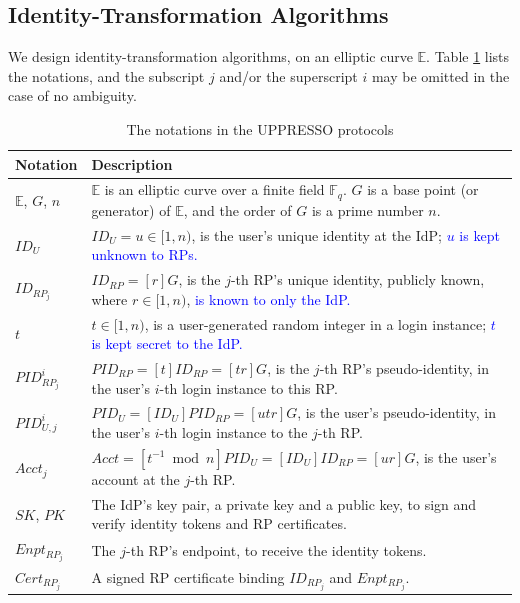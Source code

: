 
\subsection{Identity-Transformation Algorithms}
\label{subsec:overview}

We design identity-transformation algorithms,
    on an elliptic curve $\mathbb{E}$.
Table \ref{tbl:notations-protocol} lists the notations,
    and the subscript $j$ and/or the superscript $i$ may be omitted in the case of no ambiguity.

\begin{table}[tb]
\footnotesize
    \caption{The notations in the UPPRESSO protocols}
    \centering
    \begin{tabular}{|p{1.0cm}|p{6.60cm}|} \hline
    {\textbf{Notation}} & {\textbf{Description}} \\ \hline
    {$\mathbb{E}$, $G$, $n$} & {$\mathbb{E}$ is an elliptic curve over a finite field $\mathbb{F}_q$. $G$ is a base point (or generator) of $\mathbb{E}$, and the order of $G$ is a prime number $n$.} \\ \hline
    {$ID_U$} & {$ID_U = u \in [1, n)$, is the user's unique identity at the IdP; \textcolor{blue}{$u$ is kept unknown to RPs.}} \\ \hline
   {$ID_{RP_j}$} & {$ID_{RP} = [r]G$, is the $j$-th RP's unique identity, publicly known, where $r \in [1, n)$, \textcolor{blue}{is known to only the IdP.}} \\ \hline
    {$t$} & {$t \in [1, n)$, is a user-generated random integer in a login instance; \textcolor{blue}{$t$ is kept secret to the IdP.}} \\ \hline
    {$PID_{RP_j}^i$} & {$PID_{RP} = [t]{ID_{RP}} = [tr]G$, is the $j$-th RP's pseudo-identity, in the user's $i$-th login instance to this RP.} \\ \hline
    {$PID_{U,j}^i$} & {$PID_U = [{ID_U}]{PID_{RP}} = [utr]G$, is the user's pseudo-identity, in the user's $i$-th login instance to the $j$-th RP.} \\ \hline
     {$Acct_j$} & {$Acct = [t^{-1}\bmod n]PID_{U} = [ID_U]ID_{RP} = [ur]G$, is the user's account at the $j$-th RP.} \\ \hline
    {$SK$, $PK$} & {The IdP's key pair, a private key and a public key, to sign and verify identity tokens and RP certificates.} \\ \hline
    {$Enpt_{RP_j}$} & {The $j$-th RP's endpoint, to receive the identity tokens.} \\ \hline
    {$Cert_{RP_j}$} & {A signed RP certificate binding $ID_{RP_j}$ and $Enpt_{RP_j}$.} \\ \hline
    \end{tabular}
    \label{tbl:notations-protocol}
\end{table}


